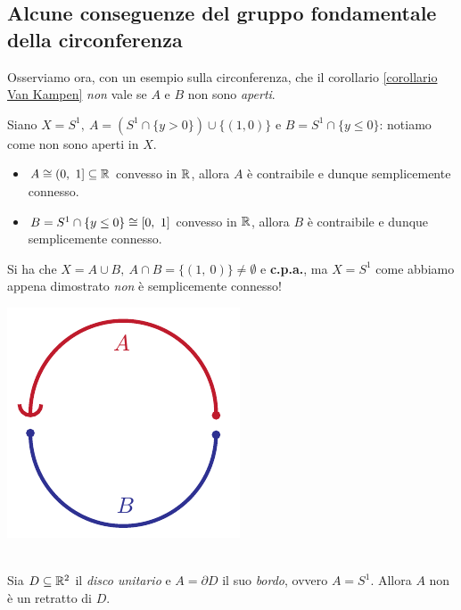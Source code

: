 \subsection{Alcune conseguenze del gruppo fondamentale della circonferenza}
Osserviamo ora, con un esempio sulla circonferenza, che il corollario \ref{corollario Van Kampen} \textit{non} vale se $A$ e $B$ non sono \textit{aperti}.
\begin{example}
	Siano $X=S^1,\ A=(S^1\cap\{y>0\})\cup \{(1,0)\}$ e $B=S^1\cap\{y\leq 0\}$: notiamo come non sono aperti in $X$.\\
\begin{minipage}{.81\linewidth}
\begin{itemize}
	\item $A\cong (0,\ 1]\subseteq \mathbb{R}$ convesso in $\mathbb{R}$, allora $A$ è contraibile e dunque semplicemente connesso.
	\item $B=S^1\cap\{y\leq 0\}\cong\left[0,\ 1\right]$ convesso in $\mathbb{R}$, allora $B$ è contraibile e dunque semplicemente connesso.
\end{itemize}
Si ha che $X=A\cup B,\ A\cap B=\{(1,\ 0)\}\neq\emptyset$ e \textbf{c.p.a.}, ma $X=S^1$ come abbiamo appena dimostrato \textit{non} è semplicemente connesso!
	\end{minipage}
	\begin{minipage}{.18\linewidth}\vspace{-6mm}
		\includegraphics[trim=0cm 0cm 0cm 0cm,clip,scale=0.6]{images/notvankampen.pdf}
	\end{minipage}
\end{example}
\begin{corollary}~{}\label{circonferenza non retratto disco}\\
Sia $D\subseteq\mathbb{R}^2$ il \textit{disco unitario} e $A=\partial{D}$ il suo \textit{bordo}, ovvero $A=S^1$. Allora $A$ non è un retratto di $D$.
\end{corollary}
